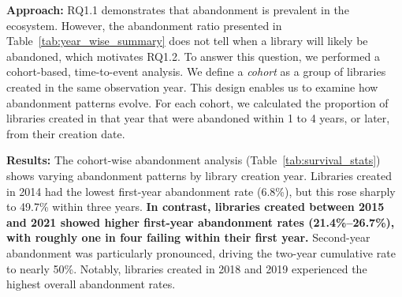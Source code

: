  

\noindent \textbf{Approach:} RQ1.1 demonstrates that abandonment is prevalent in the ecosystem. However, the abandonment ratio presented in Table~\ref{tab:year_wise_summary} does not tell when a library will likely be abandoned, which motivates RQ1.2. To answer this question, we performed a cohort-based, time-to-event analysis. We define a \textit{cohort} as a group of libraries created in the same observation year. This design enables us to examine how abandonment patterns evolve. For each cohort, we calculated the proportion of libraries created in that year that were abandoned within 1 to 4 years, or later, from their creation date.


\noindent \textbf{Results:} The cohort-wise abandonment analysis (Table~\ref{tab:survival_stats}) shows varying abandonment patterns by library creation year. Libraries created in 2014 had the lowest first-year abandonment rate (6.8\%), but this rose sharply to 49.7\% within three years. \textbf{In contrast, libraries created between 2015 and 2021 showed higher first-year abandonment rates (21.4\%–26.7\%), with roughly one in four failing within their first year.} Second-year abandonment was particularly pronounced, driving the two-year cumulative rate to nearly 50\%. Notably, libraries created in 2018 and 2019 experienced the highest overall abandonment rates.






